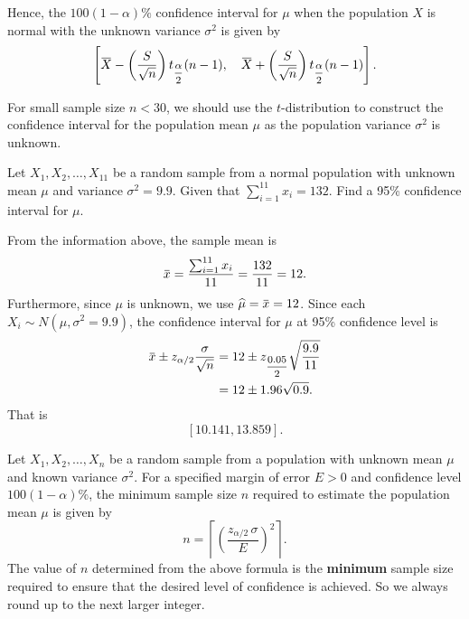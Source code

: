 Hence, the $100(1-\alpha)\%$ confidence interval for $\mu$ when the population $X$ is
normal with the unknown variance $\sigma^2$ is given by
\begin{equation}
\left[\ols{X} - \left(\frac{S}{\sqrt{n}}\right)t_{\mfrac{\alpha}{2}}(n-1),\quad \ols{X} + \left(\frac{S}{\sqrt{n}}\right)t_{\mfrac{\alpha}{2}}(n-1)\right].    
\end{equation}

\begin{remark}
    For small sample size $n < 30$, we should use the $t$-distribution to construct the confidence interval for the population mean $\mu$ as the population variance $\sigma^2$ is unknown.
\end{remark}

\begin{example}
    Let $X_1, X_2, \ldots, X_{11}$ be a random sample from a normal population with unknown mean $\mu$ and variance $\sigma^2 = 9.9$.
    Given that $\sum_{i=1}^{11} x_i = 132$. Find a 95\% confidence interval for $\mu$.
\end{example}
\begin{solution}
    From the information above, the sample mean is 
    \[
    \ols{x} = \frac{\sum_{i=1}^{11} x_i}{11} = \frac{132}{11} = 12.
    \]
    Furthermore, since $\mu$ is unknown, we use $\widehat{\mu} = \ols{x} = 12$. Since each $X_i \sim N(\mu, \sigma^2=9.9)$, 
    the confidence interval for $\mu$ at 95\% confidence level is
    \begin{align*}
        \ols{x} \pm z_{\alpha / 2} \frac{\sigma}{\sqrt{n}} &= 12 \pm z_{\mfrac{0.05}{2}} \sqrt{\frac{9.9}{11}} \\
        &= 12 \pm 1.96 \sqrt{0.9}.
    \end{align*}
    That is
    \[
        [10.141, 13.859].
    \]
\end{solution}

\begin{definition}
    Let $X_1, X_2, \ldots, X_n$ be a random sample from a population with unknown mean $\mu$ and known variance $\sigma^2$.
    For a specified margin of error $E > 0$ and confidence level $100(1-\alpha)\%$, the minimum sample size $n$ required to estimate the population mean $\mu$ is given by
    \begin{equation}
        n = \left\lceil \left(\frac{z_{\alpha / 2}\, \sigma}{E}\right)^2 \right\rceil.
    \end{equation}
    The value of $n$ determined from the above formula is the \textbf{minimum} sample size required to ensure that the desired level of confidence is achieved.
    So we always round up to the next larger integer.
\end{definition}


